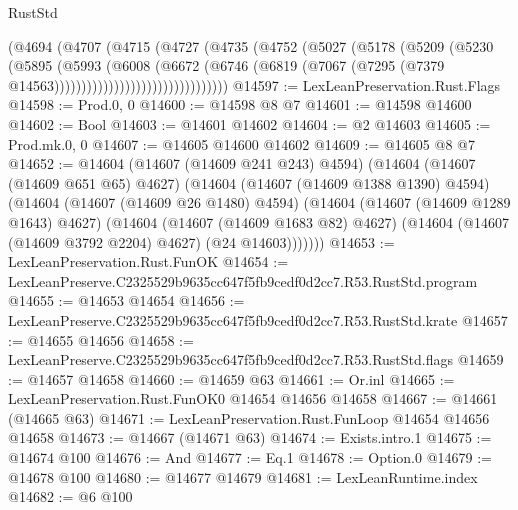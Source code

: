 \begin{lexlean}{RustStd}
\begin{coremodule}
                              (@4694
                                (@4707
                                  (@4715
                                    (@4727
                                      (@4735
                                        (@4752
                                          (@5027
                                            (@5178
                                              (@5209
                                                (@5230
                                                  (@5895
                                                    (@5993
                                                      (@6008
                                                        (@6672
                                                          (@6746
                                                            (@6819
                                                              (@7067
                                                                (@7295
                                                                  (@7379
                                                                    @14563))))))))))))))))))))))))))))))))
@14597 := LexLeanPreservation.Rust.Flags
@14598 := Prod.{0, 0}
@14600 := @14598 @8 @7
@14601 := @14598 @14600
@14602 := Bool
@14603 := @14601 @14602
@14604 := @2 @14603
@14605 := Prod.mk.{0, 0}
@14607 := @14605 @14600 @14602
@14609 := @14605 @8 @7
@14652 := @14604
    (@14607 (@14609 @241 @243) @4594)
    (@14604
      (@14607 (@14609 @651 @65) @4627)
      (@14604
        (@14607 (@14609 @1388 @1390) @4594)
        (@14604
          (@14607 (@14609 @26 @1480) @4594)
          (@14604
            (@14607 (@14609 @1289 @1643) @4627)
            (@14604
              (@14607 (@14609 @1683 @82) @4627)
              (@14604 (@14607 (@14609 @3792 @2204) @4627) (@24 @14603)))))))
@14653 := LexLeanPreservation.Rust.FunOK
@14654 := LexLeanPreserve.C2325529b9635cc647f5fb9cedf0d2cc7.R53.RustStd.program
@14655 := @14653 @14654
@14656 := LexLeanPreserve.C2325529b9635cc647f5fb9cedf0d2cc7.R53.RustStd.krate
@14657 := @14655 @14656
@14658 := LexLeanPreserve.C2325529b9635cc647f5fb9cedf0d2cc7.R53.RustStd.flags
@14659 := @14657 @14658
@14660 := @14659 @63
@14661 := Or.inl
@14665 := LexLeanPreservation.Rust.FunOK0 @14654 @14656 @14658
@14667 := @14661 (@14665 @63)
@14671 := LexLeanPreservation.Rust.FunLoop @14654 @14656 @14658
@14673 := @14667 (@14671 @63)
@14674 := Exists.intro.{1}
@14675 := @14674 @100
@14676 := And
@14677 := Eq.{1}
@14678 := Option.{0}
@14679 := @14678 @100
@14680 := @14677 @14679
@14681 := LexLeanRuntime.index
@14682 := @6 @100

\end{coremodule}
\end{lexlean}
